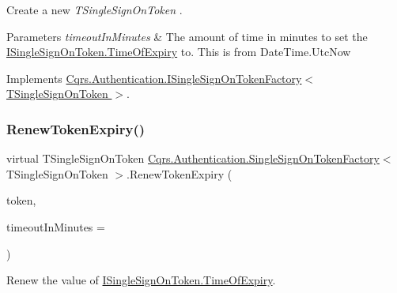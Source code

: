 Create a new {\itshape T\+Single\+Sign\+On\+Token} . 


\begin{DoxyParams}{Parameters}
{\em timeout\+In\+Minutes} & The amount of time in minutes to set the \hyperlink{interfaceCqrs_1_1Authentication_1_1ISingleSignOnToken_a50af484569cc78f88acb01f1938a7cd8_a50af484569cc78f88acb01f1938a7cd8}{I\+Single\+Sign\+On\+Token.\+Time\+Of\+Expiry} to. This is from Date\+Time.\+Utc\+Now\\
\hline
\end{DoxyParams}


Implements \hyperlink{interfaceCqrs_1_1Authentication_1_1ISingleSignOnTokenFactory_ad0795fb60ca13dd24db18556089e2834_ad0795fb60ca13dd24db18556089e2834}{Cqrs.\+Authentication.\+I\+Single\+Sign\+On\+Token\+Factory$<$ T\+Single\+Sign\+On\+Token $>$}.

\mbox{\label{classCqrs_1_1Authentication_1_1SingleSignOnTokenFactory_a699ceac65874b8319d2e26fa88f554be_a699ceac65874b8319d2e26fa88f554be}} 
\subsubsection{\texorpdfstring{Renew\+Token\+Expiry()}{RenewTokenExpiry()}}
{\footnotesize\ttfamily virtual T\+Single\+Sign\+On\+Token \hyperlink{classCqrs_1_1Authentication_1_1SingleSignOnTokenFactory}{Cqrs.\+Authentication.\+Single\+Sign\+On\+Token\+Factory}$<$ T\+Single\+Sign\+On\+Token $>$.Renew\+Token\+Expiry (\begin{DoxyParamCaption}\item[{T\+Single\+Sign\+On\+Token}]{token,  }\item[{int}]{timeout\+In\+Minutes = {} }\end{DoxyParamCaption})\hspace{0.3cm}{\ttfamily [virtual]}}



Renew the value of \hyperlink{interfaceCqrs_1_1Authentication_1_1ISingleSignOnToken_a50af484569cc78f88acb01f1938a7cd8_a50af484569cc78f88acb01f1938a7cd8}{I\+Single\+Sign\+On\+Token.\+Time\+Of\+Expiry}. 


